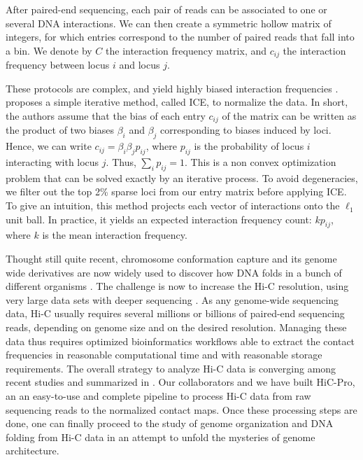 After paired-end sequencing, each pair of reads can be associated to one
\citep{lieberman-aiden:comprehensive} or several \citep{ay:identifying} DNA
interactions. We can then create a symmetric hollow matrix of integers, for
which entries correspond to the number of paired reads that fall into a bin.
We denote by $C$ the interaction frequency matrix, and $c_{ij}$ the
interaction frequency between locus $i$ and locus $j$.

These protocols are complex, and yield highly biased interaction frequencies
\citep{imakaev:iterative, cournac:normalization, yaffe:probabilistic}.
\citet{imakaev:iterative} proposes a simple iterative method, called ICE, to
normalize the data. In short, the authors assume that the bias of each entry
$c_{ij}$ of the matrix can be written as the product of two biases $\beta_i$
and $\beta_j$ corresponding to biases induced by loci. Hence, we can write
$c_{ij} = \beta_i \beta_j p_{ij}$, where $p_{ij}$ is the probability of locus
$i$ interacting with locus $j$. Thus, $\sum_i p_{ij} = 1$. This is a non convex
optimization problem that can be solved exactly by an iterative process. To
avoid degeneracies, we filter out the top 2\% sparse loci from our entry
matrix before applying ICE. To give an intuition, this method projects each
vector of interactions onto the $\ell_1$ unit ball. In practice, it yields an
expected interaction frequency count: $k p_{ij}$, where $k$ is the mean
interaction frequency.

Thought still quite recent, chromosome conformation capture and its genome
wide derivatives are now widely used to discover how DNA folds in a bunch of
different organisms \citep{duan:three, sexton:three-dimensional,
tanizawa:mapping, ay:three-dimensional}. The challenge is now to increase the
Hi-C resolution, using very large data sets with deeper sequencing
\citep{rao:3d, jin:high-resolution}. As any genome-wide sequencing data, Hi-C
usually requires several millions or billions of paired-end sequencing reads,
depending on genome size and on the desired resolution. Managing these data
thus requires optimized bioinformatics workflows able to extract the contact
frequencies in reasonable computational time and with reasonable storage
requirements. The overall strategy to analyze Hi-C data is converging among
recent studies and summarized in \cite{lajoie:hitchhiker}. Our collaborators
and we have built HiC-Pro, an an easy-to-use and complete pipeline to process
Hi-C data from raw sequencing reads to the normalized contact maps. Once these
processing steps are done, one can finally proceed to the study of genome
organization and DNA folding from Hi-C data in an attempt to unfold the
mysteries of genome architecture.

